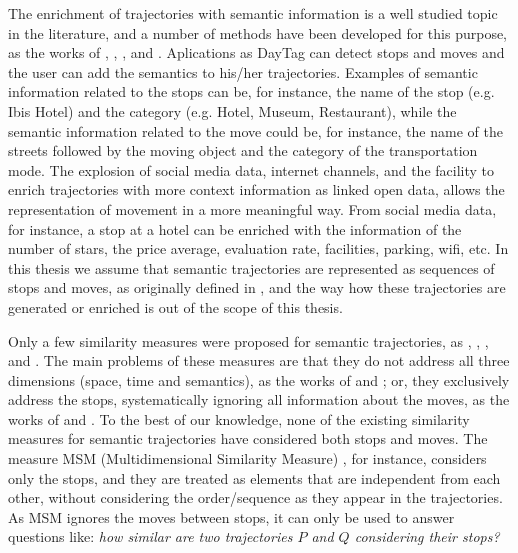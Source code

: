 {The enrichment of trajectories with semantic information is a well studied topic in the literature, and a number of methods have been developed for this purpose, as the works of} \cite{alvares2007model}, \cite{Palma2008}, \cite{manso}, and \cite{fileto2013baquara}. Aplications as DayTag \cite{fernando2013} can detect stops and moves and the user can add the semantics to his/her trajectories. {Examples of semantic information related to the stops can be, for instance, the name of the stop (e.g. Ibis Hotel) and the category (e.g. Hotel, Museum, Restaurant), while the semantic information related to the move could be, for instance, the name of the streets followed by the moving object and the category of the transportation mode. The explosion of social media data, internet channels, and the facility to enrich trajectories with more context information as linked open data, allows the representation of movement in a more meaningful way. From social media data, for instance, a stop at a hotel can be enriched with the information of the number of stars, the price average, evaluation rate, facilities, parking, wifi, etc.  In this thesis we assume that semantic trajectories are represented as sequences of stops and moves, as originally defined in }\cite{Spaccapietra:2008:CVT:1347466.1347785}{, and the way how these trajectories are generated or enriched is out of the scope of this thesis.}

{Only a few  similarity measures were proposed for semantic trajectories, as } \cite{Kang:2009:SMT:1529282.1529580}, \cite{Liu:2012:SMM:2442968.2442971}, \cite{Ying:2010:MUS:1867699.1867703}, and \cite{Furtado:TGIS12156}{. The main problems of these measures are that they do not address all three dimensions (space, time and semantics), as the works of }\cite{Kang:2009:SMT:1529282.1529580} and \cite{Liu:2012:SMM:2442968.2442971}{; or, 
they exclusively address the stops, systematically ignoring all information about the moves, as the works of }\cite{Ying:2010:MUS:1867699.1867703} and \cite{Furtado:TGIS12156}{. To the best of our knowledge, none of the existing similarity measures for semantic trajectories have considered both stops and moves. The measure MSM (Multidimensional Similarity Measure) }\cite{Furtado:TGIS12156}{, for instance, considers only the stops, and they are treated as elements that are independent from each other, without considering the order/sequence as they appear in the trajectories. As MSM ignores the moves between stops, it can only be used to answer questions like: \emph{how similar are two trajectories $P$ and $Q$ considering their stops?}}

